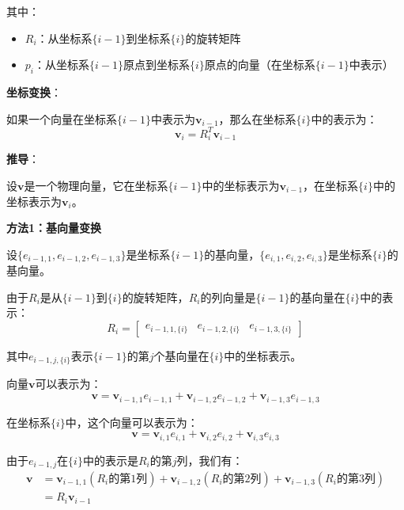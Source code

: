 \documentclass[12pt,a4paper]{article}
\begin{document}
其中：
\begin{itemize}
\item $R_i$：从坐标系$\{i-1\}$到坐标系$\{i\}$的旋转矩阵
\item $p_i$：从坐标系$\{i-1\}$原点到坐标系$\{i\}$原点的向量（在坐标系$\{i-1\}$中表示）
\end{itemize}

\textbf{坐标变换}：

如果一个向量在坐标系$\{i-1\}$中表示为$\mathbf{v}_{i-1}$，那么在坐标系$\{i\}$中的表示为：
\begin{equation}
\mathbf{v}_i = R_i^T \mathbf{v}_{i-1}
\end{equation}

\textbf{推导}：

设$\mathbf{v}$是一个物理向量，它在坐标系$\{i-1\}$中的坐标表示为$\mathbf{v}_{i-1}$，在坐标系$\{i\}$中的坐标表示为$\mathbf{v}_i$。

\textbf{方法1：基向量变换}

设$\{e_{i-1,1}, e_{i-1,2}, e_{i-1,3}\}$是坐标系$\{i-1\}$的基向量，$\{e_{i,1}, e_{i,2}, e_{i,3}\}$是坐标系$\{i\}$的基向量。

由于$R_i$是从$\{i-1\}$到$\{i\}$的旋转矩阵，$R_i$的列向量是$\{i-1\}$的基向量在$\{i\}$中的表示：
\begin{equation}
R_i = \begin{bmatrix} e_{i-1,1,\{i\}} & e_{i-1,2,\{i\}} & e_{i-1,3,\{i\}} \end{bmatrix}
\end{equation}

其中$e_{i-1,j,\{i\}}$表示$\{i-1\}$的第$j$个基向量在$\{i\}$中的坐标表示。

向量$\mathbf{v}$可以表示为：
\begin{equation}
\mathbf{v} = \mathbf{v}_{i-1,1} e_{i-1,1} + \mathbf{v}_{i-1,2} e_{i-1,2} + \mathbf{v}_{i-1,3} e_{i-1,3}
\end{equation}

在坐标系$\{i\}$中，这个向量可以表示为：
\begin{equation}
\mathbf{v} = \mathbf{v}_{i,1} e_{i,1} + \mathbf{v}_{i,2} e_{i,2} + \mathbf{v}_{i,3} e_{i,3}
\end{equation}

由于$e_{i-1,j}$在$\{i\}$中的表示是$R_i$的第$j$列，我们有：
\begin{align}
\mathbf{v} &= \mathbf{v}_{i-1,1} (R_i \text{的第1列}) + \mathbf{v}_{i-1,2} (R_i \text{的第2列}) + \mathbf{v}_{i-1,3} (R_i \text{的第3列}) \\
&= R_i \mathbf{v}_{i-1}
\end{align}
\end{document}
